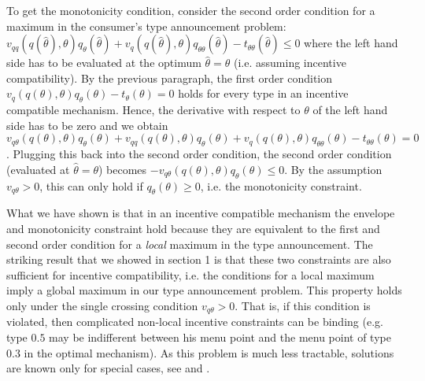 \documentclass[12pt]{article}
\begin{document}
To get the monotonicity condition, consider the second order condition for a maximum in the consumer's type announcement problem: $v_{qq}(q(\hat\theta ),\theta )q_\theta (\hat \theta)+v_{q}(q(\hat\theta ),\theta )q_{\theta \theta} (\hat \theta)-t_{\theta \theta} (\hat{ \theta })\leq0$ where the left hand side has to be evaluated at the optimum $\hat{\theta }=\theta $ (i.e. assuming incentive compatibility). By the previous paragraph, the first order condition $v_q(q(\theta ),\theta )q_\theta ( \theta)-t_\theta ({ \theta })=0$ holds for every type in an incentive compatible mechanism. Hence, the derivative with respect to $\theta $ of the left hand side has to be zero and we obtain $v_{q\theta }(q(\theta ),\theta )q_\theta (\theta )+v_{qq}(q(\theta ),\theta )q_\theta ( \theta)+v_{q}(q(\theta ),\theta )q_{\theta \theta} ( \theta)-t_{\theta \theta} ({ \theta })=0$. Plugging this back into the second order condition, the second order condition (evaluated at $\hat{\theta }=\theta $) becomes $-v_{q\theta }(q(\theta ),\theta )q_\theta (\theta )\leq 0$. By the assumption $v_{q\theta }>0$, this can only hold if $q_\theta (\theta )\geq 0$, i.e. the monotonicity constraint.

What we have shown is that in an incentive compatible mechanism the envelope and monotonicity constraint hold because they are equivalent to the first and second order condition for a \emph{local} maximum in the type announcement. The striking result that we showed in section 1 is that these two constraints are also sufficient for incentive compatibility, i.e. the conditions for a local maximum imply a global maximum in our type announcement problem. This property holds only under the single crossing condition $v_{q\theta }>0$. That is, if this condition is violated, then complicated non-local incentive constraints can be binding (e.g. type $0.5$ may be indifferent between his menu point and the menu point of type $0.3$ in the optimal mechanism). As this problem is much less tractable, solutions are known only for special cases, see \cite{araujo2010adverse} and \cite{schottmueller2015jet}.



\end{document}
